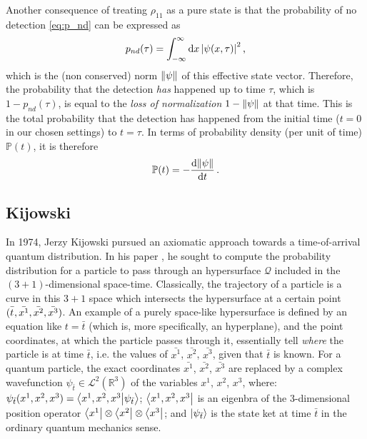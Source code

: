 Another consequence of treating $\rho_{11}$ as a pure state is that the probability of no detection
\eqref{eq:p_nd} can be expressed as
\begin{equation}
  p_{nd}(\tau) = \int_{-\infty}^{\infty} \dd{x} \qty|\psi(x, \tau)|^2 \, \text{,}
\end{equation}
which is the (non conserved) norm $\norm{\psi}$ of this effective state vector.
Therefore, the probability that the detection \emph{has} happened
up to time $\tau$, which is $1 - p_{nd}(\tau)$, is equal to the
\emph{loss of normalization} $1 - \norm{\psi}$ at that time.
This is the total probability that the detection has happened from the initial time
($t=0$ in our chosen settings)
to $t = \tau$. In terms of probability density (per unit of time)
$\mathbb{P}(t)$, it is therefore
\begin{equation}
  \mathbb{P}(t) = - \dv{\norm{\psi}}{t} \,\text{.}
\end{equation}

\subsection{Kijowski}\label{sec:kijowski}

In 1974, Jerzy Kijowski pursued an axiomatic approach towards a
time-of-arrival quantum distribution. In his paper \parencite{Kijowski}, he sought to compute
the probability distribution for a particle to pass through an hypersurface
$\mathcal{Q}$ included in the $(3+1)$-dimensional space-time.
Classically, the trajectory of a particle is a curve in this $3+1$ space
which intersects the hypersurface at a certain point $(\bar{t^{\vphantom{1em}}}, \bar{x^1}, \bar{x^2}, \bar{x^3})$.
An example of a purely
space-like hypersurface is defined by an equation like
$t=\bar{t}$ (which is, more specifically, an hyperplane), and the point coordinates,
at which the particle passes through it, essentially tell \emph{where}
the particle is at time $\bar{t}$,
i.e. the values of $\bar{x^1}$, $\bar{x^2}$, $\bar{x^3}$,
given that $\bar{t}$ is known.
For a quantum particle, the exact coordinates $\bar{x^1}$, $\bar{x^2}$, $\bar{x^3}$
are replaced by a complex wavefunction $\psi_{\bar{t}} \in \mathcal{L}^2(\mathbb{R}^3)$
of the variables $x^1$, $x^2$, $x^3$,
where:
$\psi_{\bar{t}}(x^1, x^2, x^3) = \braket{x^1, x^2, x^3}{\psi_{\bar{t}}}$;
$\bra{x^1, x^2, x^3}$ is an eigenbra of the 3-dimensional position operator $\bra{x^1} \otimes \bra{x^2} \otimes \bra{x^3}$;
and $\ket{\psi_{\bar{t}}}$ is the state ket at time $\bar{t}$ in the ordinary quantum mechanics sense.

